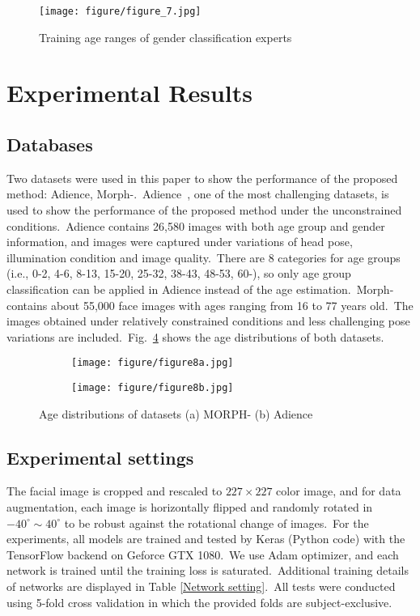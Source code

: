 \documentclass[10pt,twocolumn,letterpaper]{article}
\begin{document}
\begin{figure}[!h]
    \centering
    \texttt{[image: figure/figure\_7.jpg]}
    \caption{Training age ranges of gender classification experts}
    \label{fig:figure_7}
\end{figure}

\section{Experimental Results}
\subsection{Databases}
\label{Databases}
Two datasets were used in this paper to show the performance of the proposed method: Adience, Morph-.~Adience~\cite{Eidinger2014}, one of the most challenging datasets, is used to show the performance of the proposed method under the unconstrained conditions.~Adience contains 26,580 images with both age group and gender information, and images were captured under variations of head pose, illumination condition and image quality.~There are 8 categories for age groups (i.e., 0-2, 4-6, 8-13, 15-20, 25-32, 38-43, 48-53, 60-), so only age group classification can be applied in Adience instead of the age estimation.~Morph- \cite{morph} contains about 55,000 face images with ages ranging from 16 to 77 years old.~The images obtained under relatively constrained conditions and less challenging pose variations are included.~Fig.~\ref{fig:figure_8} shows the age distributions of both datasets.

\begin{figure}[!h]
\centering
\begin{subfigure}[t]{\linewidth}
    \centering
    \texttt{[image: figure/figure8a.jpg]}
    \caption{}
    \label{fig:figure_8a}
\end{subfigure}
\quad
\begin{subfigure}[t]{\linewidth}
    \centering
    \texttt{[image: figure/figure8b.jpg]}
    \caption{}
    \label{fig:figure_8b}
\end{subfigure}
\caption{Age distributions of datasets (a) MORPH- (b) Adience}
\label{fig:figure_8}
\end{figure}

\subsection{Experimental settings}
The facial image is cropped and rescaled to $227\times227$ color image, and for data augmentation, each image is horizontally flipped and randomly rotated in $-40^{\circ}\sim40^{\circ}$ to be robust against the rotational change of images.~For the experiments, all models are trained and tested by Keras (Python code) \cite{chollet2015keras} with the TensorFlow backend on Geforce GTX 1080.~We use Adam optimizer, and each network is trained until the training loss is saturated.~Additional training details of networks are displayed in Table \ref{Network setting}.~All tests were conducted using 5-fold cross validation in which the provided folds are subject-exclusive.
\end{document}
